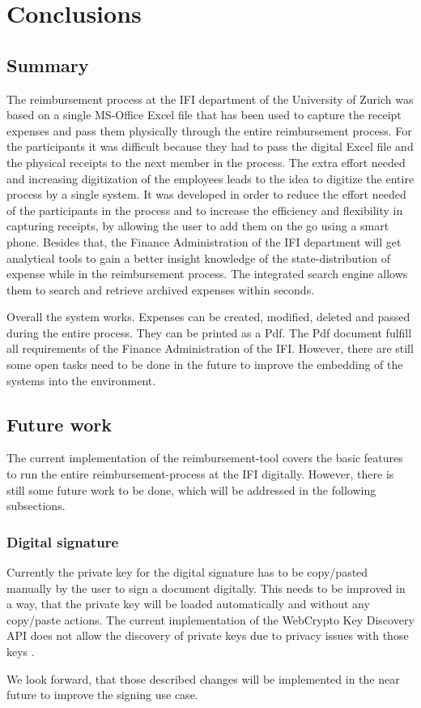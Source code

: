 \chapter{Conclusions}

\section{Summary}

The reimbursement process at the IFI department of the University of Zurich was based on a single MS-Office Excel file that has been used to capture the receipt expenses and pass them physically through the entire reimbursement process. For the participants it was difficult because they had to pass the digital Excel file and the physical receipts to the next member in the process. The extra effort needed and increasing digitization of the employees leads to the idea to digitize the entire process by a single system.\newline
It was developed in order to reduce the effort needed of the participants in the process and to increase the efficiency and flexibility in capturing receipts, by allowing the user to add them on the go using a smart phone. Besides that, the Finance Administration of the IFI department will get analytical tools to gain a better insight knowledge of the state-distribution of expense while in the reimbursement process. The integrated search engine allows them to search and retrieve archived expenses within seconds. \par
Overall the system works. Expenses can be created, modified, deleted and passed during the entire process. They can be printed as a Pdf. The Pdf document fulfill all requirements of the Finance Administration of the IFI. However, there are still some open tasks need to be done in the future to improve the embedding of the systems into the environment.


\section{Future work}
\label{sec:future-work}

The current implementation of the reimbursement-tool covers the basic features to run the entire reimbursement-process at the IFI digitally. However, there is still some future work to be done, which will be addressed in the following subsections. 

\subsection{Digital signature}
Currently the private key for the digital signature has to be copy/pasted manually by the user to sign a document digitally. This needs to be improved in a way, that the private key will be loaded automatically and without any copy/paste actions. The current implementation of the WebCrypto Key Discovery API does not allow the discovery of private keys due to privacy issues with those keys \cite{webcrypto}. \par
We look forward, that those described changes will be implemented in the near future to improve the signing use case.

